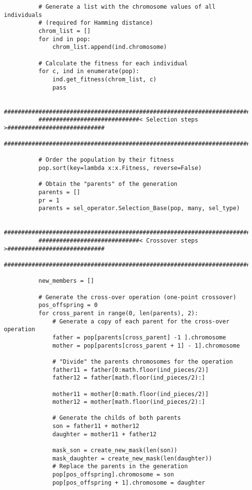 \begin{verbatim}
          # Generate a list with the chromosome values of all individuals 
          # (required for Hamming distance)
          chrom_list = []
          for ind in pop:
              chrom_list.append(ind.chromosome)

          # Calculate the fitness for each individual
          for c, ind in enumerate(pop):
              ind.get_fitness(chrom_list, c)
              pass

          ############################################################################
          #############################< Selection steps >############################
          ############################################################################ 
          
          # Order the population by their fitness
          pop.sort(key=lambda x:x.Fitness, reverse=False)

          # Obtain the "parents" of the generation
          parents = []
          pr = 1
          parents = sel_operator.Selection_Base(pop, many, sel_type)

          ############################################################################
          #############################< Crossover steps >############################
          ############################################################################
          
          new_members = []

          # Generate the cross-over operation (one-point crossover)
          pos_offspring = 0
          for cross_parent in range(0, len(parents), 2):
              # Generate a copy of each parent for the cross-over operation
              father = pop[parents[cross_parent] -1 ].chromosome
              mother = pop[parents[cross_parent + 1] - 1].chromosome
              
              # "Divide" the parents chromosomes for the operation
              father11 = father[0:math.floor(ind_pieces/2)]
              father12 = father[math.floor(ind_pieces/2):]
              
              mother11 = mother[0:math.floor(ind_pieces/2)]
              mother12 = mother[math.floor(ind_pieces/2):]
              
              # Generate the childs of both parents
              son = father11 + mother12
              daughter = mother11 + father12
              
              mask_son = create_new_mask(len(son))
              mask_daughter = create_new_mask(len(daughter))
              # Replace the parents in the generation
              pop[pos_offspring].chromosome = son
              pop[pos_offspring + 1].chromosome = daughter
              

\end{verbatim}

